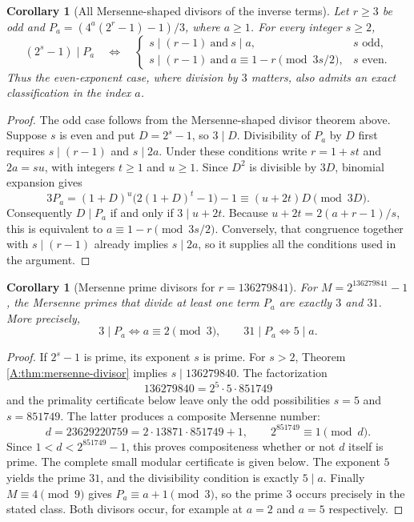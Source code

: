 \documentclass[11pt,a4paper]{article}
\newtheorem{corollary}[theorem]{Corollary}
\theoremstyle{definition}
\theoremstyle{remark}
\numberwithin{equation}{section}
\begin{document}
\begin{corollary}[All Mersenne-shaped divisors of the inverse terms]
\label{A:cor:all-mersenne-shaped-divisors}
Let $r\ge3$ be odd and $P_a=(4^a(2^r-1)-1)/3$, where $a\ge1$.
For every integer $s\ge2$,
\[
 (2^s-1)\mid P_a
 \quad\Longleftrightarrow\quad
 \begin{cases}
 s\mid(r-1)\ \text{and}\ s\mid a,&s\text{ odd},\\
 s\mid(r-1)\ \text{and}\ a\equiv1-r\pmod{3s/2},&s\text{ even}.
 \end{cases}
\]
Thus the even-exponent case, where division by $3$ matters, also admits
an exact classification in the index $a$.
\end{corollary}
\begin{proof}
The odd case follows from the Mersenne-shaped divisor theorem above.
Suppose $s$ is even and put $D=2^s-1$, so $3\mid D$.
Divisibility of $P_a$ by $D$ first requires $s\mid(r-1)$ and $s\mid2a$.
Under these conditions write $r=1+st$ and $2a=su$, with integers
$t\ge1$ and $u\ge1$. Since $D^2$ is divisible by $3D$, binomial
expansion gives
\[
 3P_a=(1+D)^u\bigl(2(1+D)^t-1\bigr)-1
       \equiv (u+2t)D\pmod{3D}.
\]
Consequently $D\mid P_a$ if and only if $3\mid u+2t$.
Because $u+2t=2(a+r-1)/s$, this is equivalent to
$a\equiv1-r\pmod{3s/2}$. Conversely, that congruence together with
$s\mid(r-1)$ already implies $s\mid2a$, so it supplies all the
conditions used in the argument.
\end{proof}

\begin{corollary}[Mersenne prime divisors for $r=136279841$]
\label{A:cor:only-two-mersenne-prime-factors}
For $M=2^{136279841}-1$, the Mersenne primes that divide at least one
term $P_a$ are exactly $3$ and $31$. More precisely,
\[
 3\mid P_a\iff a\equiv2\pmod3,\qquad
 31\mid P_a\iff5\mid a.
\]
\end{corollary}
\begin{proof}
If $2^s-1$ is prime, its exponent $s$ is prime. For $s>2$, Theorem
\ref{A:thm:mersenne-divisor} implies $s\mid136279840$. The factorization
\[
 136279840=2^5\cdot5\cdot851749
\]
and the primality certificate below leave only the odd possibilities
$s=5$ and $s=851749$. The latter produces a composite Mersenne number:
\[
 d=23629220759=2\cdot13871\cdot851749+1,
 \qquad 2^{851749}\equiv1\pmod d.
\]
Since $1<d<2^{851749}-1$, this proves compositeness whether or not $d$
itself is prime. The complete small modular certificate is given below.
The exponent $5$ yields the prime $31$, and the divisibility condition
is exactly $5\mid a$. Finally $M\equiv4\pmod9$ gives
$P_a\equiv a+1\pmod3$, so the prime $3$ occurs precisely in the stated
class. Both divisors occur, for example at $a=2$ and $a=5$ respectively.
\end{proof}
\end{document}
